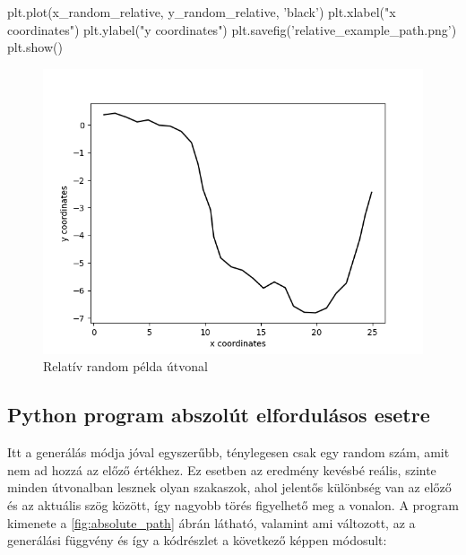 \begin{python}
plt.plot(x_random_relative, y_random_relative, 'black')
plt.xlabel("x coordinates")
plt.ylabel("y coordinates")
plt.savefig('relative_example_path.png')
plt.show()
\end{python}


\begin{figure}[h!]
\centering
\includegraphics[scale=0.75]{images/relative_example_path.png}
\caption{Relatív random példa útvonal}
\label{fig:relative_path}
\end{figure}

\newpage

\subsection{Python program abszolút elfordulásos esetre}

Itt a generálás módja jóval egyszerűbb, ténylegesen csak egy random szám, amit nem ad hozzá az előző értékhez. Ez esetben az eredmény kevésbé reális, szinte minden útvonalban lesznek olyan szakaszok, ahol jelentős különbség van az előző és az aktuális szög között, így nagyobb törés figyelhető meg a vonalon. A program kimenete a \ref{fig:absolute_path} ábrán látható, valamint ami változott, az a generálási függvény és így a kódrészlet a következő képpen módosult:\\

